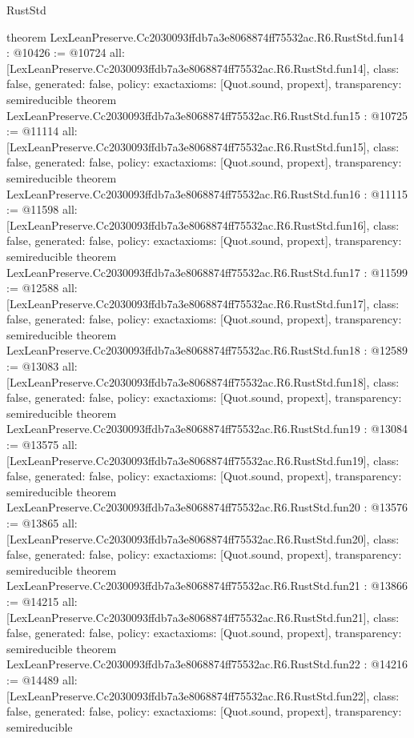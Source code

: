 \begin{lexlean}{RustStd}
\begin{coremodule}
{}
theorem LexLeanPreserve.Cc2030093ffdb7a3e8068874ff75532ac.R6.RustStd.fun14 : @10426 := @10724 {
  all: [LexLeanPreserve.Cc2030093ffdb7a3e8068874ff75532ac.R6.RustStd.fun14],
  class: false,
  generated: false,
  policy: exact{axioms: [Quot.sound, propext]},
  transparency: semireducible
}
theorem LexLeanPreserve.Cc2030093ffdb7a3e8068874ff75532ac.R6.RustStd.fun15 : @10725 := @11114 {
  all: [LexLeanPreserve.Cc2030093ffdb7a3e8068874ff75532ac.R6.RustStd.fun15],
  class: false,
  generated: false,
  policy: exact{axioms: [Quot.sound, propext]},
  transparency: semireducible
}
theorem LexLeanPreserve.Cc2030093ffdb7a3e8068874ff75532ac.R6.RustStd.fun16 : @11115 := @11598 {
  all: [LexLeanPreserve.Cc2030093ffdb7a3e8068874ff75532ac.R6.RustStd.fun16],
  class: false,
  generated: false,
  policy: exact{axioms: [Quot.sound, propext]},
  transparency: semireducible
}
theorem LexLeanPreserve.Cc2030093ffdb7a3e8068874ff75532ac.R6.RustStd.fun17 : @11599 := @12588 {
  all: [LexLeanPreserve.Cc2030093ffdb7a3e8068874ff75532ac.R6.RustStd.fun17],
  class: false,
  generated: false,
  policy: exact{axioms: [Quot.sound, propext]},
  transparency: semireducible
}
theorem LexLeanPreserve.Cc2030093ffdb7a3e8068874ff75532ac.R6.RustStd.fun18 : @12589 := @13083 {
  all: [LexLeanPreserve.Cc2030093ffdb7a3e8068874ff75532ac.R6.RustStd.fun18],
  class: false,
  generated: false,
  policy: exact{axioms: [Quot.sound, propext]},
  transparency: semireducible
}
theorem LexLeanPreserve.Cc2030093ffdb7a3e8068874ff75532ac.R6.RustStd.fun19 : @13084 := @13575 {
  all: [LexLeanPreserve.Cc2030093ffdb7a3e8068874ff75532ac.R6.RustStd.fun19],
  class: false,
  generated: false,
  policy: exact{axioms: [Quot.sound, propext]},
  transparency: semireducible
}
theorem LexLeanPreserve.Cc2030093ffdb7a3e8068874ff75532ac.R6.RustStd.fun20 : @13576 := @13865 {
  all: [LexLeanPreserve.Cc2030093ffdb7a3e8068874ff75532ac.R6.RustStd.fun20],
  class: false,
  generated: false,
  policy: exact{axioms: [Quot.sound, propext]},
  transparency: semireducible
}
theorem LexLeanPreserve.Cc2030093ffdb7a3e8068874ff75532ac.R6.RustStd.fun21 : @13866 := @14215 {
  all: [LexLeanPreserve.Cc2030093ffdb7a3e8068874ff75532ac.R6.RustStd.fun21],
  class: false,
  generated: false,
  policy: exact{axioms: [Quot.sound, propext]},
  transparency: semireducible
}
theorem LexLeanPreserve.Cc2030093ffdb7a3e8068874ff75532ac.R6.RustStd.fun22 : @14216 := @14489 {
  all: [LexLeanPreserve.Cc2030093ffdb7a3e8068874ff75532ac.R6.RustStd.fun22],
  class: false,
  generated: false,
  policy: exact{axioms: [Quot.sound, propext]},
  transparency: semireducible
}
\end{coremodule}
\end{lexlean}
